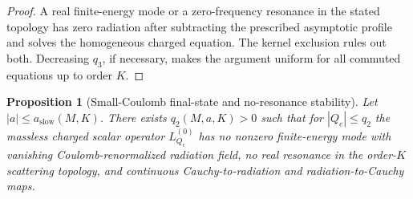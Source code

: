 \documentclass[11pt]{article}
\numberwithin{equation}{section}
\theoremstyle{plain}
\newtheorem{proposition}[theorem]{Proposition}
\theoremstyle{definition}
\theoremstyle{remark}
\begin{document}
\begin{proof}
A real finite-energy mode or a zero-frequency resonance in the stated topology has zero radiation after subtracting the prescribed asymptotic profile and solves the homogeneous charged equation.  The kernel exclusion rules out both.  Decreasing \(q_3\), if necessary, makes the argument uniform for all commuted equations up to order \(K\).

\end{proof}

\begin{proposition}[Small-Coulomb final-state and no-resonance stability]\label{prop:small-coulomb-final-state}
Let \(|a|\le a_{\mathrm{slow}}(M,K)\).  There exists \(q_2(M,a,K)>0\) such that for \(|Q_e|\le q_2\) the massless charged scalar operator \(L_{Q_e}^{(0)}\) has no nonzero finite-energy mode with vanishing Coulomb-renormalized radiation field, no real resonance in the order-\(K\) scattering topology, and continuous Cauchy-to-radiation and radiation-to-Cauchy maps.
\end{proposition}
\end{document}
